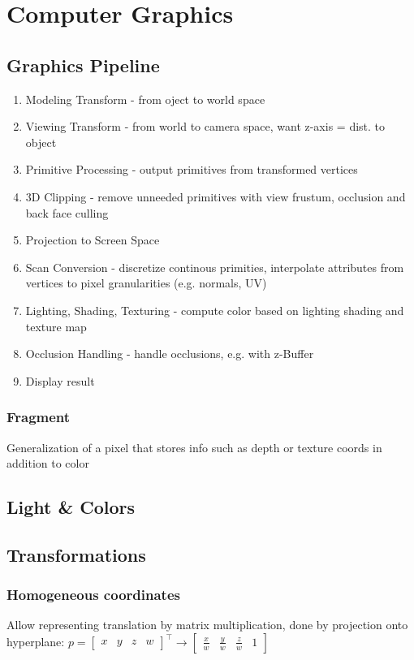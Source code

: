 \documentclass[a4paper,10pt]{article}
\begin{document}
\section{Computer Graphics}
\subsection{Graphics Pipeline}
\begin{enumerate}
    \item Modeling Transform - from oject to world space
    \item Viewing Transform - from world to camera space, want z-axis = dist. to object
    \item Primitive Processing - output primitives from transformed vertices
    \item 3D Clipping - remove unneeded primitives with view frustum, occlusion and back face culling
    \item Projection to Screen Space
    \item Scan Conversion - discretize continous primities, interpolate attributes from vertices to pixel granularities (e.g. normals, UV)
    \item Lighting, Shading, Texturing - compute color based on lighting shading and texture map
    \item Occlusion Handling - handle occlusions, e.g. with z-Buffer
    \item Display result
\end{enumerate}

\subsubsection{Fragment} Generalization of a pixel that stores info such as depth or texture coords in addition to color

\subsection{Light \& Colors}

\subsection{Transformations}
\subsubsection{Homogeneous coordinates}
Allow representing translation by matrix multiplication, done by projection onto hyperplane: \( p = \left[\begin{smallmatrix}x & y & z & w\end{smallmatrix}\right]^\top \to \left[\begin{smallmatrix}\frac{x}{w} & \frac{y}{w} & \frac{z}{w} & 1\end{smallmatrix}\right] \)
\end{document}
